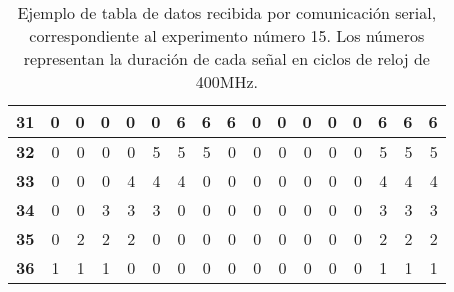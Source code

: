 \begin{table}[ht]
{\begin{tabular}{|l|r|r|r|r|r|r|r|r|r|r|r|r|r|r|r|r|}
				\textbf{31} & 0  & 0  & 0  & 0  & 0  & 6  & 6  & 6  & 0  & 0  & 0  & 0  & 0  & 6  & 6  & 6 \\ \hline
				\rowcolor[HTML]{FFFFFF} 
				\textbf{32} & 0  & 0  & 0  & 0  & 5  & 5  & 5  & 0  & 0  & 0  & 0  & 0  & 0  & 5  & 5  & 5 \\ \hline
				\rowcolor[HTML]{E2EFDA} 
				\textbf{33} & 0  & 0  & 0  & 4  & 4  & 4  & 0  & 0  & 0  & 0  & 0  & 0  & 0  & 4  & 4  & 4 \\ \hline
				\rowcolor[HTML]{FFFFFF} 
				\textbf{34} & 0  & 0  & 3  & 3  & 3  & 0  & 0  & 0  & 0  & 0  & 0  & 0  & 0  & 3  & 3  & 3 \\ \hline
				\rowcolor[HTML]{E2EFDA} 
				\textbf{35} & 0  & 2  & 2  & 2  & 0  & 0  & 0  & 0  & 0  & 0  & 0  & 0  & 0  & 2  & 2  & 2 \\ \hline
				\rowcolor[HTML]{FFFFFF} 
				\textbf{36} & 1  & 1  & 1  & 0  & 0  & 0  & 0  & 0  & 0  & 0  & 0  & 0  & 0  & 1  & 1  & 1 \\ \hline
			\end{tabular}%
		}
		\caption{Ejemplo de tabla de datos recibida por comunicación serial, correspondiente al experimento número 15. Los números representan la duración de cada señal en ciclos de reloj de 400MHz.}
		\label{tab:datos-serial}
	\end{table}
